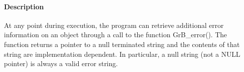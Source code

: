 \paragraph{Description}


At any point during execution, the program can retrieve additional
error information on an object through a
call to the function {\sf GrB\_error()}. 
The function returns a pointer to a null terminated string and the contents of that string
are implementation dependent. In particular, a null string (not a {\sf NULL} pointer) is always a valid error string.


